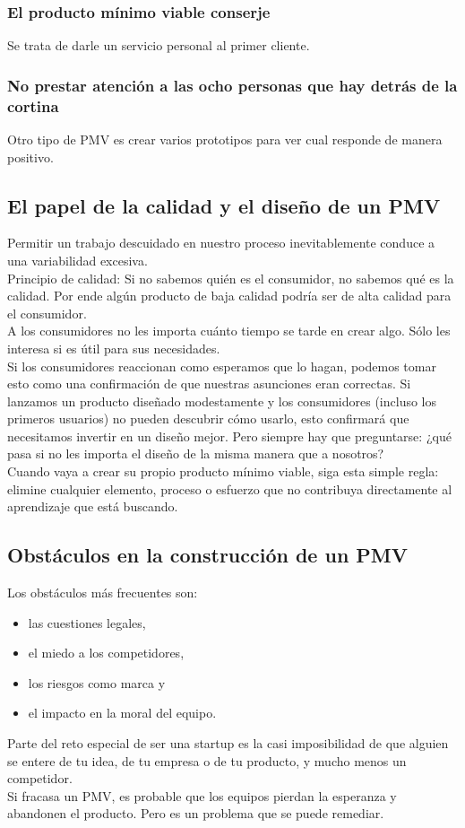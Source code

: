\documentclass[10pt]{article}
\begin{document}
\begin{multicols}{2}
\subsubsection*{El producto mínimo viable conserje}
Se trata de darle un servicio personal al primer cliente.
\subsubsection*{No prestar atención a las ocho personas que hay detrás de la cortina}
Otro tipo de PMV es crear varios prototipos para ver cual responde de manera positivo.
\subsection*{El papel de la calidad y el diseño de un PMV}
Permitir un trabajo descuidado en nuestro proceso inevitablemente conduce a una variabilidad excesiva.\\
Principio de calidad: Si no sabemos quién es el consumidor, no sabemos qué es la calidad. Por ende algún producto de baja calidad podría ser de alta calidad para el consumidor.\\
{\color{blue} A los consumidores no les importa cuánto tiempo se tarde en crear algo. Sólo les interesa si es útil para sus necesidades.}\\
{\color{blue}Si los consumidores reaccionan como esperamos que lo hagan, podemos tomar esto como una confirmación de que nuestras asunciones eran correctas. Si lanzamos un producto diseñado modestamente y los consumidores (incluso los primeros usuarios) no pueden descubrir cómo usarlo, esto confirmará que necesitamos invertir en un diseño mejor. Pero siempre hay que preguntarse: ¿qué pasa si no les importa el diseño de la misma manera que a nosotros?}\\
{\color{blue} Cuando vaya a crear su propio producto mínimo viable, siga esta simple regla: elimine cualquier elemento, proceso o esfuerzo que no contribuya directamente al aprendizaje que está buscando.}
\subsection*{Obstáculos en la construcción de un PMV}
Los obstáculos más frecuentes son:
\begin{itemize}
\item  las cuestiones legales, 
\item el miedo a los competidores,
\item los riesgos como marca y 
\item el impacto en la moral del equipo.
\end{itemize}
Parte del reto especial de ser una startup es la casi imposibilidad de que alguien se entere de tu idea, de tu empresa o de tu producto, y mucho menos un competidor.\\
Si fracasa un PMV, es probable que los equipos pierdan la esperanza y abandonen el producto. Pero es un problema que se puede remediar.

\end{multicols}
\end{document}
